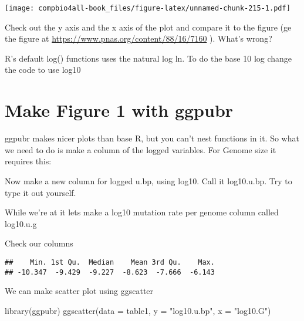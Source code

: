 \documentclass[
]{book}
\newenvironment{Shaded}{\begin{snugshade}}{\end{snugshade}}
\newcommand{\AttributeTok}[1]{\textcolor[rgb]{0.77,0.63,0.00}{#1}}
\newcommand{\FunctionTok}[1]{\textcolor[rgb]{0.00,0.00,0.00}{#1}}
\newcommand{\NormalTok}[1]{#1}
\newcommand{\OtherTok}[1]{\textcolor[rgb]{0.56,0.35,0.01}{#1}}
\newcommand{\SpecialCharTok}[1]{\textcolor[rgb]{0.00,0.00,0.00}{#1}}
\newcommand{\StringTok}[1]{\textcolor[rgb]{0.31,0.60,0.02}{#1}}
\begin{document}
\texttt{[image: compbio4all-book\_files/figure-latex/unnamed-chunk-215-1.pdf]}

Check out the y axis and the x axis of the plot and compare it to the figure (ge the figure at \url{https://www.pnas.org/content/88/16/7160}
). What's wrong?

R's default log() functions uses the natural log ln. To do the base 10 log change the code to use log10

\hypertarget{make-figure-1-with-ggpubr}{%
\section{Make Figure 1 with ggpubr}\label{make-figure-1-with-ggpubr}}

ggpubr makes nicer plots than base R, but you can't nest functions in it. So what we need to do is make a column of the logged variables. For Genome size it requires this:

\begin{Shaded}
\end{Shaded}

Now make a new column for logged u.bp, using log10. Call it log10.u.bp. Try to type it out yourself.

While we're at it lets make a log10 mutation rate per genome column called log10.u.g

Check our columns

\begin{Shaded}
\end{Shaded}

\begin{verbatim}
##    Min. 1st Qu.  Median    Mean 3rd Qu.    Max. 
## -10.347  -9.429  -9.227  -8.623  -7.666  -6.143
\end{verbatim}

We can make scatter plot using ggscatter

\begin{Shaded}
\begin{Highlighting}[]
\FunctionTok{library}\NormalTok{(ggpubr)}
\FunctionTok{ggscatter}\NormalTok{(}\AttributeTok{data =}\NormalTok{ table1,}
          \AttributeTok{y =} \StringTok{"log10.u.bp"}\NormalTok{,}
          \AttributeTok{x =} \StringTok{"log10.G"}\NormalTok{)}
\end{Highlighting}
\end{Shaded}
\end{document}
